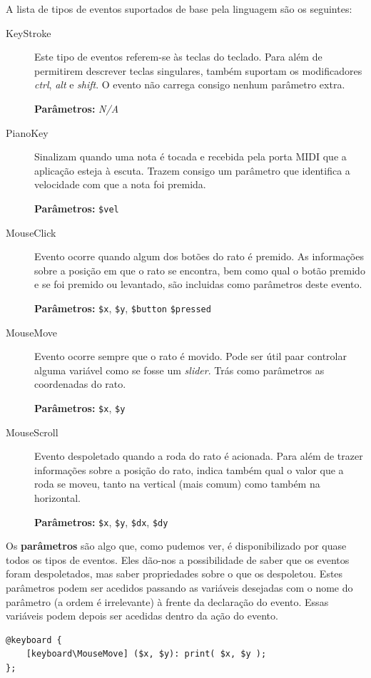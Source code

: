 A lista de tipos de eventos suportados de base pela linguagem são os seguintes:
\begin{description}
 \item[KeyStroke]
 Este tipo de eventos referem-se às teclas do teclado. Para além de permitirem descrever teclas singulares, também suportam os modificadores \textit{ctrl}, \textit{alt} e \textit{shift}. O evento não carrega consigo nenhum parâmetro extra.
 
 \textbf{Parâmetros:} \textit{N/A}
 \item[PianoKey] Sinalizam quando uma nota é tocada e recebida pela porta MIDI que a aplicação esteja à escuta. Trazem consigo um parâmetro que identifica a velocidade com que a nota foi premida.
 
 \textbf{Parâmetros:} \texttt{\$vel}
 \item[MouseClick] Evento ocorre quando algum dos botões do rato é premido. As informações sobre a posição em que o rato se encontra, bem como qual o botão premido e se foi premido ou levantado, são incluidas como parâmetros deste evento.
 
 \textbf{Parâmetros:} \texttt{\$x}, \texttt{\$y}, \texttt{\$button} \texttt{\$pressed}
 \item[MouseMove] Evento ocorre sempre que o rato é movido. Pode ser útil paar controlar alguma variável como se fosse um \textit{slider}. Trás como parâmetros as coordenadas do rato.
 
 \textbf{Parâmetros:} \texttt{\$x}, \texttt{\$y}
 \item[MouseScroll] Evento despoletado quando a roda do rato é acionada. Para além de trazer informações sobre a posição do rato, indica também qual o valor que a roda se moveu, tanto na vertical (mais comum) como também na horizontal.
 
 \textbf{Parâmetros:} \texttt{\$x}, \texttt{\$y}, \texttt{\$dx}, \texttt{\$dy}
\end{description}

Os \textbf{parâmetros} são algo que, como pudemos ver, é disponibilizado por quase todos os tipos de eventos. Eles dão-nos a possibilidade de saber que os eventos foram despoletados, mas saber propriedades sobre o que os despoletou. Estes parâmetros podem ser acedidos passando as variáveis desejadas com o nome do parâmetro (a ordem é irrelevante) à frente da declaração do evento. Essas variáveis podem depois ser acedidas dentro da ação do evento.

\begin{lstlisting}[caption={Teclado que imprime as coordenadas do rato sempre que ele se move}]
@keyboard {
    [keyboard\MouseMove] ($x, $y): print( $x, $y );
};
\end{lstlisting}

